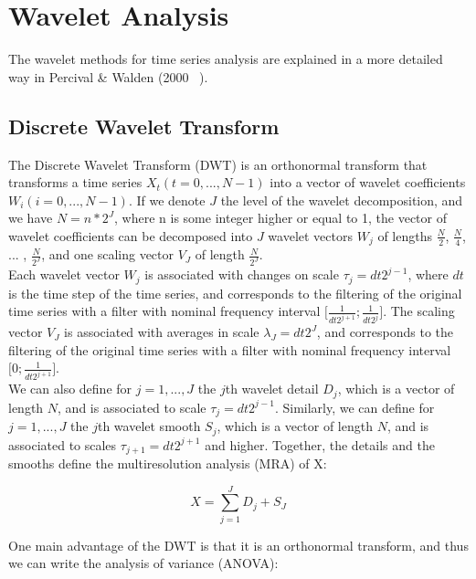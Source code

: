 \documentclass[methods.tex]{subfiles}
\begin{document}
\chapter{Wavelet Analysis}

The wavelet methods for time series analysis are explained in a more detailed way in Percival \& Walden (2000 ~\cite{PER_2000}). \\

\section{Discrete Wavelet Transform}

The Discrete Wavelet Transform (DWT) is an orthonormal transform that transforms a time series $X_t \left( t = 0, ... , N - 1 \right)$ into a vector of wavelet coefficients $W_i \left( i = 0 , ... , N - 1 \right)$. If we denote $J$ the level of the wavelet decomposition, and we have $N = n* 2^J$, where n is some integer higher or equal to 1, the vector of wavelet coefficients can be decomposed into $J$ wavelet vectors $W_j$ of lengths $\frac{N}{2}$, $\frac{N}{4}$, ... , $\frac{N}{2^J}$, and one scaling vector $V_J$ of length $\frac{N}{2^J}$. \\

Each wavelet vector $W_j$ is associated with changes on scale $\tau_j = dt 2^{j - 1}$, where $dt$ is the time step of the time series, and corresponds to the filtering of the original time series with a filter with nominal frequency interval $\lbrack \frac{1}{dt 2^{j + 1}} ; \frac{1}{dt 2^j} \rbrack$. The scaling vector $V_J$ is associated with averages in scale $\lambda_J = dt 2^J$, and corresponds to the filtering of the original time series with a filter with nominal frequency interval $\lbrack 0 ; \frac{1}{dt 2^{j + 1}} \rbrack$. \\

We can also define for $j = 1 , ... , J$ the $j$th wavelet detail $D_j$, which is a vector of length $N$, and is associated to scale $\tau_j = dt 2^{j - 1}$. Similarly, we can define for $j = 1 , ... , J$ the $j$th wavelet smooth $S_j$, which is a vector of length $N$, and is associated to scales $\tau_{j + 1} = dt 2^{j + 1}$ and higher. Together, the details and the smooths define the multiresolution analysis (MRA) of X:

\begin{equation}
X = \sum_{j = 1}^{J} D_j + S_J
\end{equation}

One main advantage of the DWT is that it is an orthonormal transform, and thus we can write the analysis of variance (ANOVA):
\end{document}
